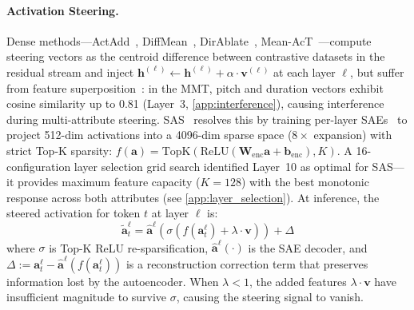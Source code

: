 \documentclass{article}
\theoremstyle{plain}
\begin{document}
\paragraph{Activation Steering.}
Dense methods---ActAdd~\cite{turner2024activation}, DiffMean~\cite{rimsky2024steering}, DirAblate~\cite{arditi2024refusal}, Mean-AcT~\cite{rodriguez2025meantransport}---compute steering vectors as the centroid difference between contrastive datasets in the residual stream and inject $\mathbf{h}^{(\ell)} \leftarrow \mathbf{h}^{(\ell)} + \alpha \cdot \mathbf{v}^{(\ell)}$ at each layer $\ell$, but suffer from feature superposition~\cite{elhage2022superposition}: in the MMT, pitch and duration vectors exhibit cosine similarity up to 0.81 (Layer~3, \cref{app:interference}), causing interference during multi-attribute steering. SAS~\cite{bayat2025sas} resolves this by training per-layer SAEs~\cite{bricken2023monosemanticity, cunningham2024sparse} to project 512-dim activations into a 4096-dim sparse space ($8{\times}$ expansion) with strict Top-K sparsity: $f(\mathbf{a}) = \text{TopK}(\text{ReLU}(\mathbf{W}_\text{enc}\mathbf{a} + \mathbf{b}_\text{enc}), K)$. A 16-configuration layer selection grid search identified Layer~10 as optimal for SAS---it provides maximum feature capacity ($K{=}128$) with the best monotonic response across both attributes (see \cref{app:layer_selection}). At inference, the steered activation for token $t$ at layer $\ell$ is:
\begin{equation}
    \tilde{\mathbf{a}}_t^\ell = \hat{\mathbf{a}}^\ell\!\left(\sigma\!\left(f(\mathbf{a}_t^\ell) + \lambda \cdot \mathbf{v}\right)\right) + \Delta
    \label{eq:sas}
\end{equation}
where $\sigma$ is Top-K ReLU re-sparsification, $\hat{\mathbf{a}}^\ell(\cdot)$ is the SAE decoder, and $\Delta := \mathbf{a}_t^\ell - \hat{\mathbf{a}}^\ell(f(\mathbf{a}_t^\ell))$ is a reconstruction correction term that preserves information lost by the autoencoder. When $\lambda < 1$, the added features $\lambda \cdot \mathbf{v}$ have insufficient magnitude to survive $\sigma$, causing the steering signal to vanish.
\end{document}
